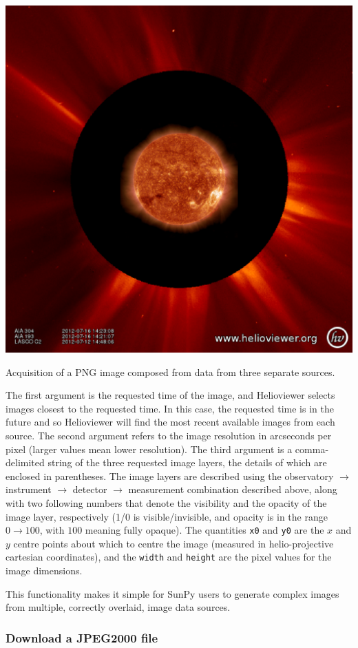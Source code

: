 \begin{listing}[H]
\begin{center}
\includegraphics[width=0.6\columnwidth]{helioviewer_overlay_example}
\end{center}
\caption{Acquisition of a PNG image composed from data from three
  separate sources.}
\label{code:hv:overlaid}
\end{listing}

The first argument is the requested time of the image, and Helioviewer
selects images closest to the requested time.  In this case, the
requested time is in the future and so Helioviewer will find the most
recent available images from each source.  The second argument refers
to the image resolution in arcseconds per pixel (larger values mean
lower resolution).  The third argument is a comma-delimited string of
the three requested image layers, the details of which are enclosed
in parentheses. The image layers are described using the observatory
$\rightarrow$ instrument $\rightarrow$ detector $\rightarrow$
measurement combination described above, along with two following
numbers that denote the visibility and the opacity of the image layer,
respectively (1/0 is visible/invisible, and opacity is in the range
$0\rightarrow100$, with $100$ meaning fully opaque).  The quantities
\texttt{x0} and \texttt{y0} are the $x$ and $y$ centre points about
which to centre the image (measured in helio-projective cartesian
coordinates), and the \texttt{width} and \texttt{height} are the pixel
values for the image dimensions.

This functionality makes it simple for SunPy users to generate complex
images from multiple, correctly overlaid, image data sources.

\subsubsection{Download a JPEG2000 file}\label{sssec:hv:jp}


